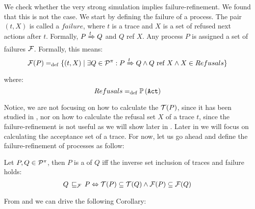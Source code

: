We check whether the very strong simulation implies failure-refinement. We found that this is not the case. We start by defining the failure of a process.
The pair $(t, X)$ is called a $failure$, where $t$ is a trace and $X$ is a set of refused next actions after $t$. Formally, $P \xRightarrow{t} Q$ and $Q$ ref $X$. Any process
$P$ is assigned a set of failures $\Failures[]$. Formally, this means:
\begin{align}
    \Failures[P] \define \{(t,X) \mid \exists Q\in\procs: P \bigstep{t} Q \wedge Q \text{ ref } X \wedge X\in Refusals\}
\label{failure}
\end{align}
where: \[Refusals =_{\mathrm{def}} \mathbb P\left(\mathtt{Act}\right)\]

Notice, we are not focusing on how to calculate the $\Traces[P]$, since it has been studied in \cite{gieseking}, nor on how to calculate the refusal set $X$ of a trace $t$, since the failure-refinement is not useful as we will show later in . Later in  we will focus on calculating the acceptance set of a trace.
For now, let us go ahead and define the failure-refinement of \picalc{} processes as follow:

\begin{definition}
\label{def_failure_ref}
	Let $P,Q\in\mathcal P^{\pi}$, then $P$ is a  of $Q$ iff the inverse set inclusion of traces and failure holds:
\begin{align}
   Q \refiF P \Leftrightarrow  \Traces[P]\subseteq\Traces[Q] \wedge \Failures[P]\subseteq\Failures[Q]
\end{align}
\end{definition}

From  and  we can drive the following Corollary: 

